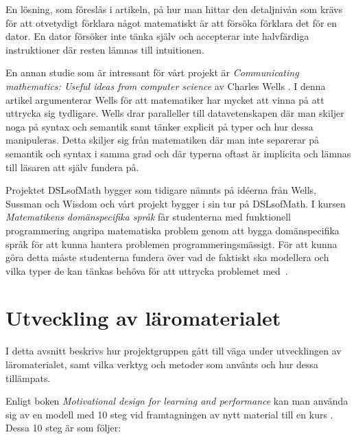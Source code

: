 \documentclass[]{article}
\begin{document}
En lösning, som föreslås i artikeln, på hur man hittar den
detaljnivån som krävs för att otvetydigt förklara något matematiskt är
att försöka förklara det för en dator. En dator försöker inte tänka
själv och accepterar inte halvfärdiga instruktioner där resten lämnas
till intuitionen.

En annan studie som är intressant för vårt projekt är
\textit{Communicating mathematics: Useful ideas from computer science}
av Charles Wells \cite{wells1995communicating}. I denna artikel 
argumenterar Wells för att matematiker har mycket att vinna på att 
uttrycka sig tydligare. Wells
drar paralleller till datavetenskapen där man skiljer noga på syntax
och semantik samt tänker explicit på typer och hur dessa
manipuleras. Detta skiljer sig från matematiken där man inte separerar
på semantik och syntax i samma grad och där typerna oftast är
implicita och lämnas till läsaren att själv fundera på.

Projektet DSLsofMath bygger som tidigare nämnts på idéerna från Wells,
Sussman och Wisdom och vårt projekt bygger i sin tur på DSLsofMath. 
I kursen \textit{Matematikens domänspecifika
 språk} får studenterna med funktionell programmering angripa
matematiska problem genom att bygga domänspecifika språk för att kunna
hantera problemen programmeringsmässigt. För att kunna göra detta
måste studenterna fundera över vad de faktiskt ska modellera och vilka
typer de kan tänkas behöva för att uttrycka problemet
med~\cite{kursplan:dslsofmath}.

\newpage

\section{Utveckling av läromaterialet}
\label{sec:utveckling}



I detta avsnitt beskrivs hur projektgruppen gått till väga under
utvecklingen av läromaterialet, samt vilka verktyg och metoder som
använts och hur dessa tillämpats.

Enligt boken \textit{Motivational design for learning and performance}
kan man använda sig av en modell med 10 steg vid framtagningen av nytt
material till en kurs \cite{motivational_design}. Dessa 10 steg är som följer:
\end{document}
